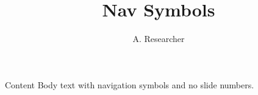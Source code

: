 \documentclass{beamer}
\title{Nav Symbols}
\author{A. Researcher}
\begin{document}
{
\begin{frame}[plain]\titlepage\end{frame}
}
\begin{frame}{Content}
Body text with navigation symbols and no slide numbers.
\end{frame}
\end{document}
